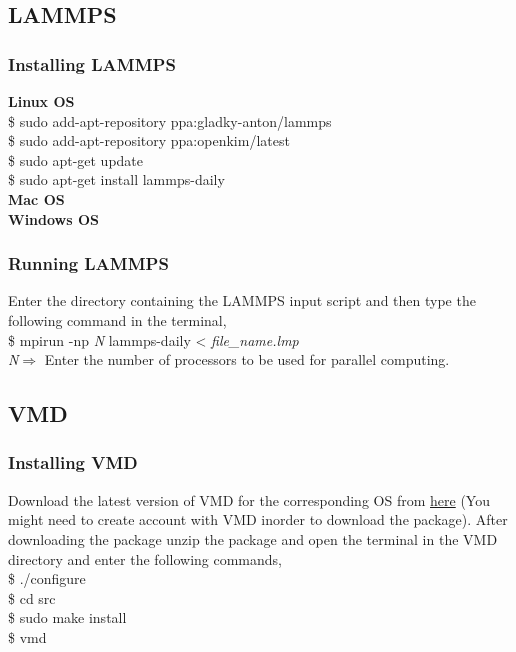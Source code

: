 \documentclass[12pt]{article}
\begin{document}
\subsection{LAMMPS}

\subsubsection{Installing LAMMPS}

\textbf{Linux OS}\\
\$ sudo add-apt-repository ppa:gladky-anton/lammps\\
\$ sudo add-apt-repository ppa:openkim/latest\\
\$ sudo apt-get update\\
\$ sudo apt-get install lammps-daily\\
\newline
\textbf{Mac OS}\\
\newline
\textbf{Windows OS}\\

\subsubsection{Running LAMMPS}
Enter the directory containing the LAMMPS input script and then type the 
following command in the terminal,\\
\$ mpirun -np \textit{N} lammps-daily < \textit{file\_name.lmp}\\
\textit{N}$\Rightarrow$ Enter the number of processors to be used for parallel computing.\\

\subsection{VMD}

\subsubsection{Installing VMD}

Download the latest version of VMD for the corresponding OS from 
\href{https://www.ks.uiuc.edu/Development/Download/download.cgi?PackageName=VMD}{here} 
(You might need to create account with VMD inorder to download the package).
After downloading the package unzip the package and open the terminal in the 
VMD directory and enter the following commands,\\
\$ ./configure \\
\$ cd src \\ 
\$ sudo make install \\
\$ vmd \\
\end{document}
